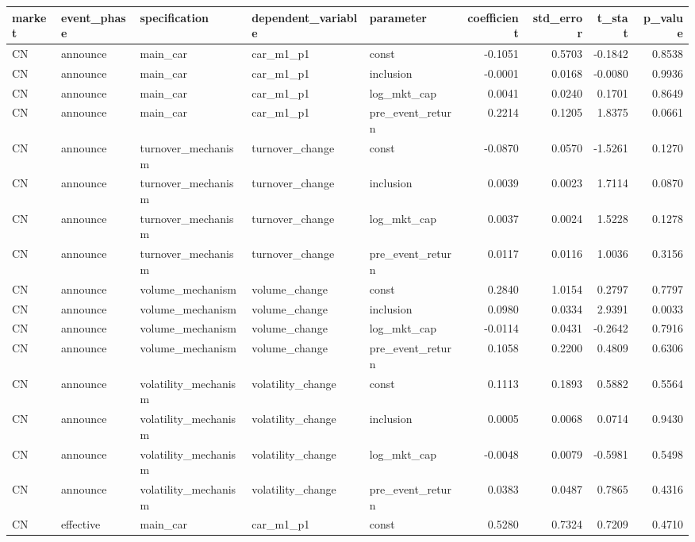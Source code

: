 \begin{tabular}{lllllrrrr}
\toprule
market & event_phase & specification & dependent_variable & parameter & coefficient & std_error & t_stat & p_value \\
\midrule
CN & announce & main_car & car_m1_p1 & const & -0.1051 & 0.5703 & -0.1842 & 0.8538 \\
CN & announce & main_car & car_m1_p1 & inclusion & -0.0001 & 0.0168 & -0.0080 & 0.9936 \\
CN & announce & main_car & car_m1_p1 & log_mkt_cap & 0.0041 & 0.0240 & 0.1701 & 0.8649 \\
CN & announce & main_car & car_m1_p1 & pre_event_return & 0.2214 & 0.1205 & 1.8375 & 0.0661 \\
CN & announce & turnover_mechanism & turnover_change & const & -0.0870 & 0.0570 & -1.5261 & 0.1270 \\
CN & announce & turnover_mechanism & turnover_change & inclusion & 0.0039 & 0.0023 & 1.7114 & 0.0870 \\
CN & announce & turnover_mechanism & turnover_change & log_mkt_cap & 0.0037 & 0.0024 & 1.5228 & 0.1278 \\
CN & announce & turnover_mechanism & turnover_change & pre_event_return & 0.0117 & 0.0116 & 1.0036 & 0.3156 \\
CN & announce & volume_mechanism & volume_change & const & 0.2840 & 1.0154 & 0.2797 & 0.7797 \\
CN & announce & volume_mechanism & volume_change & inclusion & 0.0980 & 0.0334 & 2.9391 & 0.0033 \\
CN & announce & volume_mechanism & volume_change & log_mkt_cap & -0.0114 & 0.0431 & -0.2642 & 0.7916 \\
CN & announce & volume_mechanism & volume_change & pre_event_return & 0.1058 & 0.2200 & 0.4809 & 0.6306 \\
CN & announce & volatility_mechanism & volatility_change & const & 0.1113 & 0.1893 & 0.5882 & 0.5564 \\
CN & announce & volatility_mechanism & volatility_change & inclusion & 0.0005 & 0.0068 & 0.0714 & 0.9430 \\
CN & announce & volatility_mechanism & volatility_change & log_mkt_cap & -0.0048 & 0.0079 & -0.5981 & 0.5498 \\
CN & announce & volatility_mechanism & volatility_change & pre_event_return & 0.0383 & 0.0487 & 0.7865 & 0.4316 \\
CN & effective & main_car & car_m1_p1 & const & 0.5280 & 0.7324 & 0.7209 & 0.4710 \\

\end{tabular}
